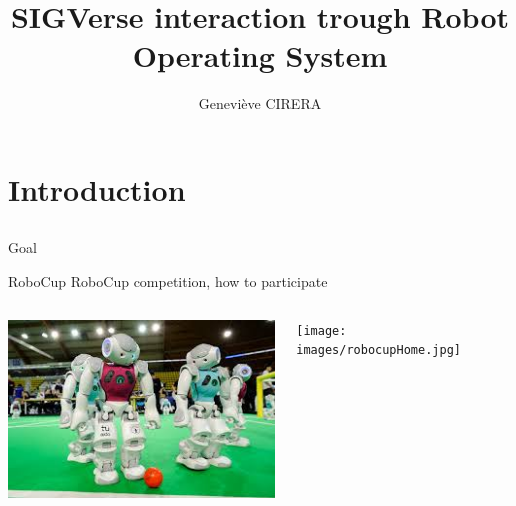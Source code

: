 \documentclass[11pt]{beamer}
\title{SIGVerse interaction trough Robot Operating System}
\author{Geneviève CIRERA}\institute{Polytech'Nice-Sophia}
\date{\oldstylenums{\today}}
\begin{document}
\begin{frame}
\titlepage
\end{frame}



\section{Introduction}

\subsection*{}
\begin{frame}{Goal}
\begin{center}%
\end{center}
\end{frame}

\begin{frame}{RoboCup}		
	RoboCup competition, how to participate
	\begin{columns}[t]
		\begin{column}[T]{.5\textwidth}
			\includegraphics[width=1\textwidth]{images/robocupFoot.jpg}
		\end{column}
		\begin{column}[T]{.5\textwidth}
			\texttt{[image: images/robocupHome.jpg]}	
		\end{column}
	\end{columns}
\end{frame}
\end{document}
